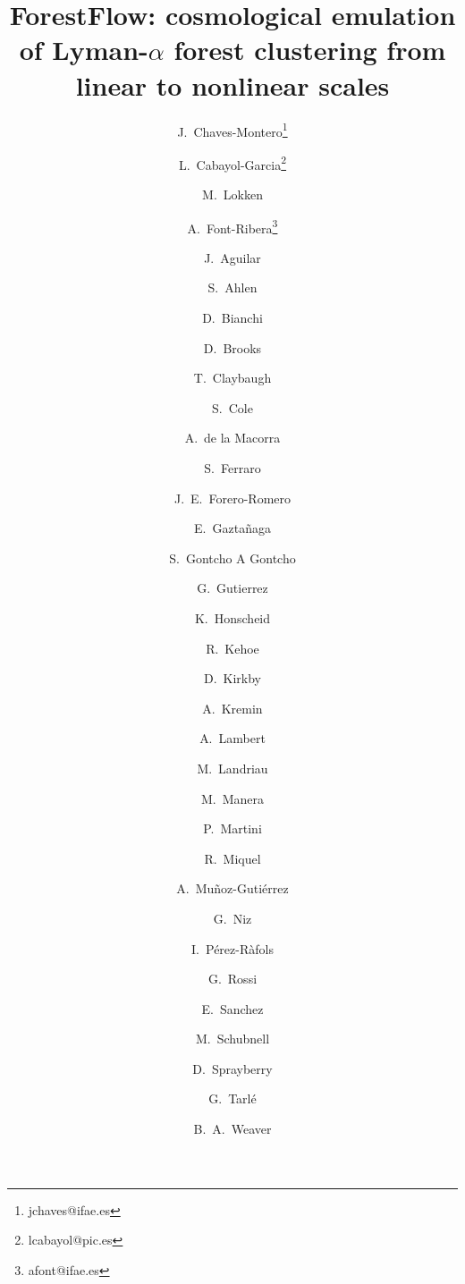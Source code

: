 \title{ForestFlow: cosmological emulation of Lyman-$\alpha$ forest clustering from linear to nonlinear scales}

\author{
J.~Chaves-Montero\inst{\ref{inst0}}\thanks{jchaves@ifae.es}
\and
L.~Cabayol-Garcia\inst{\ref{inst0},\ref{inst1}}\thanks{lcabayol@pic.es}
\and
M.~Lokken\inst{\ref{inst0}}
\and
A.~Font-Ribera\inst{\ref{inst0}}\thanks{afont@ifae.es}
\and
J.~Aguilar\inst{\ref{inst2}}
\and
S.~Ahlen\inst{\ref{inst3}}
\and
D.~Bianchi\inst{\ref{inst19}}
\and
D.~Brooks\inst{\ref{inst23}}
\and
T.~Claybaugh\inst{\ref{inst2}}
\and
S.~Cole\inst{\ref{inst6}}
\and
A.~de la Macorra\inst{\ref{inst37}}
\and
S.~Ferraro\inst{\ref{inst2},\ref{inst43}}
\and
J.~E.~Forero-Romero\inst{\ref{inst52},\ref{inst53}}
\and
E.~Gaztañaga\inst{\ref{inst55},\ref{inst27}}
\and
S.~Gontcho A Gontcho\inst{\ref{inst2}}
\and
G.~Gutierrez\inst{\ref{inst25}}
\and
K.~Honscheid\inst{\ref{inst33},\ref{inst46},\ref{inst47}}
\and
R.~Kehoe\inst{\ref{inst66}}
\and
D.~Kirkby\inst{\ref{inst14}}
\and
A.~Kremin\inst{\ref{inst2}}
\and
A.~Lambert\inst{\ref{inst2}}
\and
M.~Landriau\inst{\ref{inst2}}
\and
M.~Manera\inst{\ref{inst75},\ref{inst0}}
\and
P.~Martini\inst{\ref{inst33},\ref{inst65},\ref{inst47}}
\and
R.~Miquel\inst{\ref{inst77},\ref{inst0}}
\and
A.~Muñoz-Gutiérrez\inst{\ref{inst37}}
\and
G.~Niz\inst{\ref{inst36},\ref{inst11}}
\and
I.~P\'erez-R\`afols\inst{\ref{inst84}}
\and
G.~Rossi\inst{\ref{inst88}}
\and
E.~Sanchez\inst{\ref{inst38}}
\and
M.~Schubnell\inst{\ref{inst7}}
\and
D.~Sprayberry\inst{\ref{inst21}}
\and
G.~Tarl\'{e}\inst{\ref{inst7}}
\and
B.~A.~Weaver\inst{\ref{inst21}}
}


